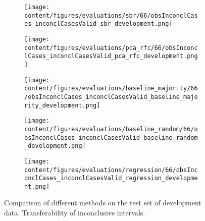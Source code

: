 \begin{figure}[ht]
  \begin{subfigure}{0.45\textwidth}
    \centering
    \texttt{[image: content/figures/evaluations/sbr/66/obsInconclCases\_inconclCasesValid\_sbr\_development.png]}
  \end{subfigure}
  \hfill
  \begin{subfigure}{0.45\textwidth}
    \centering
    \texttt{[image: content/figures/evaluations/pca\_rfc/66/obsInconclCases\_inconclCasesValid\_pca\_rfc\_development.png]}
  \end{subfigure}
  \hfill
  \begin{subfigure}{0.45\textwidth}
    \centering
    \texttt{[image: content/figures/evaluations/baseline\_majority/66/obsInconclCases\_inconclCasesValid\_baseline\_majority\_development.png]}
  \end{subfigure}
  \hfill
  \begin{subfigure}{0.45\textwidth}
    \centering
    \texttt{[image: content/figures/evaluations/baseline\_random/66/obsInconclCases\_inconclCasesValid\_baseline\_random\_development.png]}
  \end{subfigure}
  \hfill
  \begin{subfigure}{0.45\textwidth}
    \centering
    \texttt{[image: content/figures/evaluations/regression/66/obsInconclCases\_inconclCasesValid\_regression\_development.png]}
  \end{subfigure}

  \caption{Comparison of different methods on the test set of development data. Transferability of inconclusive intervals.}
  \label{fig:test_interval_match_dev}
\end{figure}


